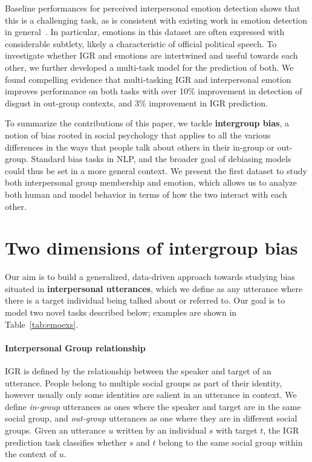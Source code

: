 Baseline performances for perceived interpersonal emotion detection shows that this is a challenging task, as is consistent with existing work in emotion detection in general~\cite{demszky-etal-2020-goemotions}. In particular, emotions in this dataset are often expressed with considerable subtlety, likely a characteristic of official political speech. To investigate whether IGR and emotions are intertwined and useful towards each other, we further developed a multi-task model for the prediction of both. We found compelling evidence that multi-tasking IGR and interpersonal emotion improves performance on both tasks with over 10\% improvement in detection of disgust in out-group contexts, and 3\% improvement in IGR prediction.

To summarize the contributions of this paper, we tackle \textbf{intergroup bias}, a notion of bias rooted in social psychology that applies to all the various differences in the ways that people talk about others in their in-group or out-group. Standard bias tasks in NLP, and the broader goal of debiasing models could thus be set in a more general context. We present the first dataset to study both interpersonal group membership and emotion, which allows us to analyze both human and model behavior in terms of how the two interact with each other.

\section{Two dimensions of intergroup bias}
\label{section:twitter-dimensions}

Our aim is to build a generalized, data-driven approach towards studying bias situated in \textbf{interpersonal utterances}, which we define as any utterance where there is a target individual being talked about or referred to. Our goal is to model two novel tasks described below; examples are shown in Table~\ref{tab:emoexs}.

\paragraph{Interpersonal Group relationship} IGR is defined by the relationship between the speaker and target of an utterance. People belong to multiple social groups as part of their identity, however usually only some identities are salient in an utterance in context. We define \emph{in-group} utterances as ones where the speaker and target are in the same social group, and \emph{out-group} utterances as one where they are in different social groups. Given an utterance $u$ written by an individual $s$ with target $t$, the IGR prediction task classifies whether $s$ and $t$ belong to the same social group within the context of $u$.

